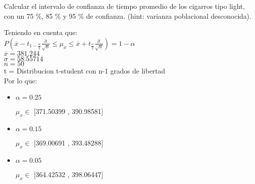 Calcular el intervalo de confianza de tiempo promedio de los cigarros tipo light, con un 75 \%, 85 \% y
95 \% de confianza. (hint: varianza poblacional desconocida).

Teniendo en cuenta que:\\

$P(\overline{x} - t_{1-\frac{\alpha}{2}}\frac{\widehat{\sigma}}{\sqrt{n}} \leq \mu_x \leq \overline{x} + t_{\frac{\alpha}{2}}\frac{\widehat{\sigma}}{\sqrt{n}}) = 1 - \alpha$\\
$\overline{x} = 381.244$\\
$\widehat{\sigma} = 58.55714$\\
$n = 50$\\
t = Distribucion t-student con n-1 grados de libertad\\

Por lo que: \\

\begin{itemize}

\item $\alpha = 0.25$

$\mu_x \in$ [371.50399 , 390.98581]

\item $\alpha = 0.15$

$\mu_x \in$ [369.00691 , 393.48288]

\item $\alpha = 0.05$

$\mu_x \in$ [364.42532 , 398.06447]

\end{itemize}
